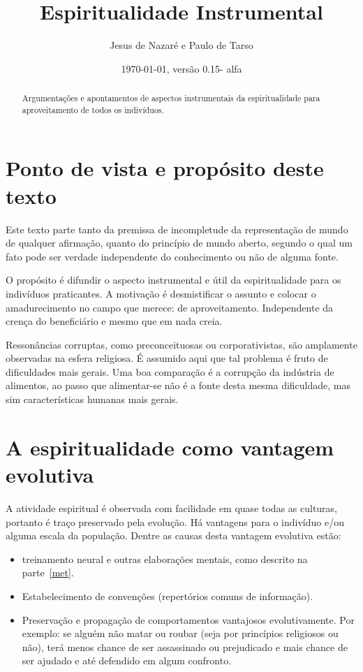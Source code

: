 \documentclass[a4paper]{article}
\title{Espiritualidade Instrumental}
\author{Jesus de Nazaré e Paulo de Tarso}
\date{\today, versão 0.15- alfa}
\begin{document}
\maketitle

\begin{abstract}
Argumentações e apontamentos de aspectos instrumentais da espiritualidade para
aproveitamento de todos os indivíduos.
\end{abstract}

\tableofcontents

\section{Ponto de vista e propósito deste texto}

\qquad Este texto parte tanto da premissa de incompletude da representação de
mundo de qualquer afirmação, quanto do princípio de mundo aberto, segundo o qual
um fato pode ser verdade independente do conhecimento ou não de alguma fonte.

O propósito é difundir o aspecto instrumental e útil da espiritualidade para os
indivíduos praticantes. A motivação é desmistificar o assunto e colocar o
amadurecimento no campo que merece: de aproveitamento. Independente da crença do
beneficiário e mesmo que em nada creia.

Ressonâncias corruptas, como preconceituosas ou corporativistas, são amplamente
observadas na esfera religiosa. É assumido aqui que tal problema é fruto de
dificuldades mais gerais. Uma boa comparação é a corrupção da indústria de
alimentos, ao passo que alimentar-se não é a fonte desta mesma dificuldade, mas
sim características humanas mais gerais.

\section{A espiritualidade como vantagem evolutiva}

\qquad A atividade espiritual é observada com facilidade em quase todas as
culturas, portanto é traço preservado pela evolução. Há vantagens para o
indivíduo e/ou alguma escala da população. Dentre as causas desta vantagem
evolutiva estão:

\begin{itemize}
  \item treinamento neural e outras elaborações mentais, como descrito na
  parte~\ref{met}.

  \item Estabelecimento de convenções (repertórios comuns de informação).

  \item Preservação e propagação de comportamentos vantajosos evolutivamente.
  Por exemplo: se alguém não matar ou roubar (seja por princípios religiosos ou
  não), terá menos chance de ser assassinado ou prejudicado e mais chance de ser
  ajudado e até defendido em algum confronto.
\end{itemize}
\end{document}
